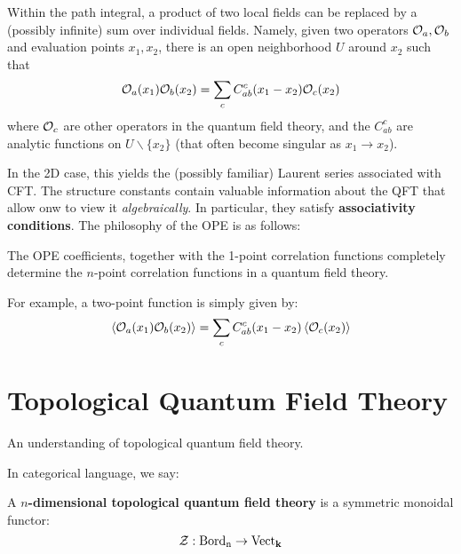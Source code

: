 		\begin{prop}
			 Within the path integral, a product of two local fields can be replaced by a (possibly infinite) sum over individual fields. Namely, given two operators $\mathcal O_a, \mathcal O_b$ and evaluation points $x_1, x_2$, there is an open neighborhood $U$ around $x_2$ such that
			\begin{equation}
				\mathcal O_a (x_1) \mathcal O_b(x_2) = \sum_c C_{ab}^c(x_1-x_2) \mathcal O_c(x_2)
			\end{equation}
		where $\mathcal O_c$ are other operators in the quantum field theory, and the $C_{ab}^c$ are analytic functions on $U \backslash \{ x_2 \}$ (that often become singular as $x_1 \to x_2$).
		\end{prop}
	
		In the 2D case, this yields the (possibly familiar) Laurent series associated with CFT. The structure constants contain valuable information about the QFT that allow onw to view it \emph{algebraically}. In particular, they satisfy \textbf{associativity conditions}. The philosophy of the OPE is as follows: %
		\begin{idea}
			The OPE coefficients, together with the 1-point correlation functions completely determine the $n$-point correlation functions in a quantum field theory. 
		\end{idea}
	\noindent 	For example, a two-point function is simply given by:
		\begin{equation}
			\left< \mathcal O_a(x_1) \mathcal O_b(x_2) \right> = \sum_c C^c_{ab}(x_1 - x_2) \left< \mathcal O_c (x_2) \right>
		\end{equation}
	
	
	
	\section{Topological Quantum Field Theory} %
	\label{sec:topological_quantum_field_theory}
	
	An understanding of topological quantum field theory. 
	
	In categorical language, we say:
	\begin{defn}
		A \textbf{$n$-dimensional topological quantum field theory} is a symmetric monoidal functor:
			\[
				\mathcal Z: \mathrm{Bord_n} \to \mathrm{Vect}_{\mathbf{k}}
			\]
	\end{defn} 
	

